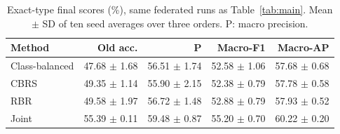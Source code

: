 \begin{table}[t]
\centering
\caption{Exact-type final scores (\%), same federated runs as Table~\ref{tab:main}. Mean $\pm$ SD of ten seed averages over three orders. P: macro precision.}
\label{tab:exact}
\footnotesize\setlength{\tabcolsep}{2.4pt}
\begin{tabular}{lrrrr}
\toprule
Method & Old acc. & P & Macro-F1 & Macro-AP\\
\midrule
Class-balanced & 47.68 $\pm$ 1.68 & 56.51 $\pm$ 1.74 & 52.58 $\pm$ 1.06 & 57.68 $\pm$ 0.68\\
CBRS & 49.35 $\pm$ 1.14 & 55.90 $\pm$ 2.15 & 52.38 $\pm$ 0.79 & 57.78 $\pm$ 0.58\\
RBR & 49.58 $\pm$ 1.97 & 56.72 $\pm$ 1.48 & 52.88 $\pm$ 0.79 & 57.93 $\pm$ 0.52\\
Joint & 55.39 $\pm$ 0.11 & 59.48 $\pm$ 0.87 & 55.20 $\pm$ 0.70 & 60.22 $\pm$ 0.20\\
\bottomrule
\end{tabular}
\end{table}
